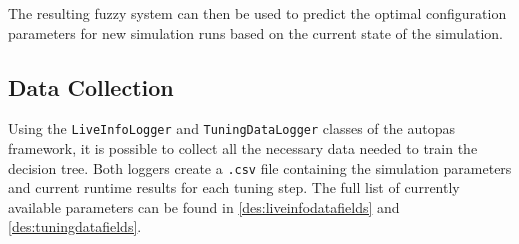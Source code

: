 The resulting fuzzy system can then be used to predict the optimal configuration parameters for new simulation runs based on the current state of the simulation.

\subsection{Data Collection}

Using the \texttt{LiveInfoLogger} and \texttt{TuningDataLogger} classes of the \gls{autopas} framework, it is possible to collect all the necessary data needed to train the decision tree. Both loggers create a \texttt{.csv} file containing the simulation parameters and current runtime results for each tuning step. The full list of currently available parameters can be found in \autoref{des:liveinfodatafields} and \autoref{des:tuningdatafields}.